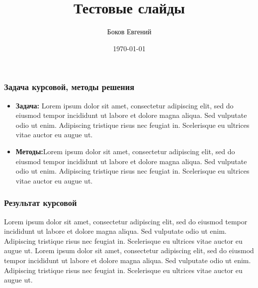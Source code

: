 \documentclass{beamer}
\title{Тестовые слайды}
\author{Боков Евгений}
\institute{Балтийский Федеральный Университет имени Иманила Канта\\
	1 курс направления Компьютерная безопасность}
\date{\today}
\begin{document}
	\begin{frame}
	\titlepage
	\end{frame}
	\begin{frame}
	\frametitle{Задача курсовой, методы решения}
		\begin{itemize}
			\item \textbf{Задача:} Lorem ipsum dolor sit amet, consectetur adipiscing elit, sed do eiusmod tempor incididunt ut labore et dolore magna aliqua. Sed vulputate odio ut enim. Adipiscing tristique risus nec feugiat in. Scelerisque eu ultrices vitae auctor eu augue ut.
			\item \textbf{Методы:}Lorem ipsum dolor sit amet, consectetur adipiscing elit, sed do eiusmod tempor incididunt ut labore et dolore magna aliqua. Sed vulputate odio ut enim. Adipiscing tristique risus nec feugiat in. Scelerisque eu ultrices vitae auctor eu augue ut.
		\end{itemize}
	\end{frame}
	\begin{frame}
	\frametitle{Результат курсовой}
		Lorem ipsum dolor sit amet, consectetur adipiscing elit, sed do eiusmod tempor incididunt ut labore et dolore magna aliqua. Sed vulputate odio ut enim. Adipiscing tristique risus nec feugiat in. Scelerisque eu ultrices vitae auctor eu augue ut. Lorem ipsum dolor sit amet, consectetur adipiscing elit, sed do eiusmod tempor incididunt ut labore et dolore magna aliqua. Sed vulputate odio ut enim. Adipiscing tristique risus nec feugiat in. Scelerisque eu ultrices vitae auctor eu augue ut.
	\end{frame}
\end{document}
